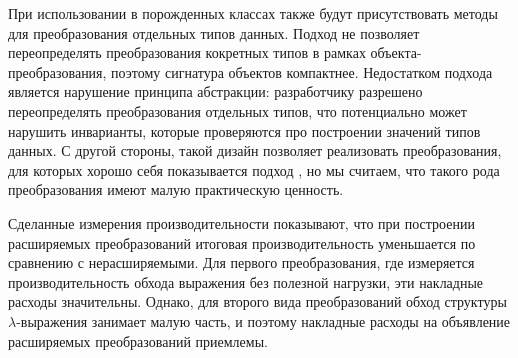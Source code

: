 При использовании \visitors{} в порожденных классах также будут присутствовать методы для преобразования отдельных типов данных. Подход \GT{} не позволяет переопределять преобразования кокретных типов в рамках объекта-преобразования, поэтому сигнатура объектов компактнее.
Недостатком подхода \visitors{} является нарушение принципа абстракции: разработчику разрешено переопределять преобразования отдельных типов, что потенциально может нарушить инварианты, которые проверяются про построении значений типов данных. С другой стороны, такой дизайн позволяет реализовать преобразования, для которых хорошо себя показывается подход \cite{SYB}, но мы считаем, что такого рода преобразования имеют малую практическую ценность.

Сделанные измерения производительности показывают, что при построении расширяемых преобразований итоговая производительность уменьшается по сравнению с нерасширяемыми. Для первого  преобразования, где измеряется производительность обхода выражения без полезной нагрузки, эти накладные расходы значительны. Однако, для второго вида преобразований обход структуры $\lambda$-выражения занимает малую часть, и поэтому накладные расходы на объявление расширяемых преобразований приемлемы.

